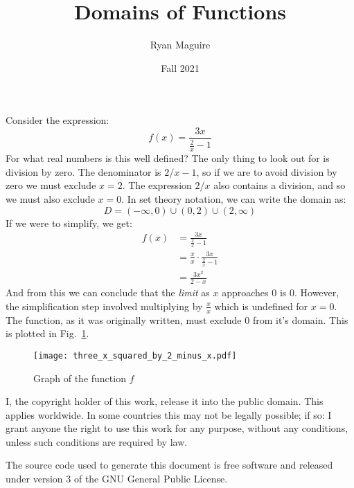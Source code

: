 \documentclass{article}
\title{Domains of Functions}
\author{Ryan Maguire}
\date{Fall 2021}
\begin{document}
    \maketitle
    Consider the expression:
    \begin{equation}
        f(x)=\frac{3x}{\frac{2}{x}-1}
    \end{equation}
    For what real numbers is this well defined? The only thing to look out for
    is division by zero. The denominator is $2/x-1$, so if we are to avoid
    division by zero we must exclude $x=2$. The expression $2/x$ also
    contains a division, and so we must also exclude $x=0$. In set theory
    notation, we can write the domain as:
    \begin{equation}
        D=(-\infty,0)\cup(0,2)\cup(2,\infty)
    \end{equation}
    If we were to simplify, we get:
    \begin{align}
        f(x)&=\frac{3x}{\frac{2}{x}-1}\\
            &=\frac{x}{x}\cdot\frac{3x}{\frac{2}{x}-1}\\
            &=\frac{3x^{2}}{2-x}
    \end{align}
    And from this we can conclude that the \textit{limit} as $x$ approaches
    0 is 0. However, the simplification step involved multiplying by
    $\frac{x}{x}$ which is undefined for $x=0$. The function, as it was
    originally written, must exclude 0 from it's domain. This is
    plotted in Fig.~\ref{fig:graph_of_func}.
    \begin{figure}
        \centering
        \texttt{[image: three\_x\_squared\_by\_2\_minus\_x.pdf]}
        \caption{Graph of the function $f$}
        \label{fig:graph_of_func}
    \end{figure}
    \newpage
    I, the copyright holder of this work, release it into the public domain.
    This applies worldwide. In some countries this may not be legally possible;
    if so: I grant anyone the right to use this work for any purpose, without
    any conditions, unless such conditions are required by law.
    \par\hfill\par
    The source code used to generate this document is free software and released
    under version 3 of the GNU General Public License.
\end{document}
